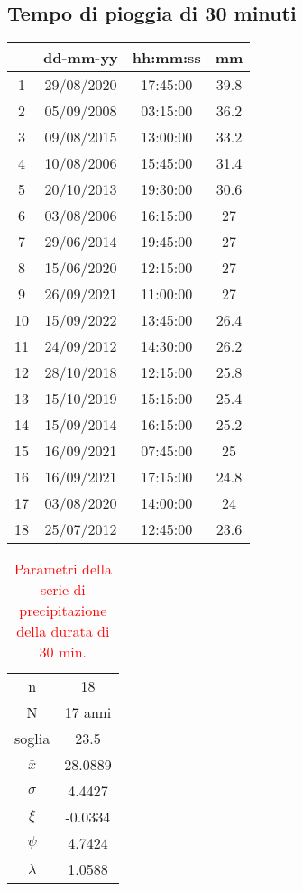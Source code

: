 \subsection{Tempo di pioggia di 30 minuti}
\begin{table}[H] \centering
    \begin{tabular}{cccc}
        \toprule
       & dd-mm-yy   & hh:mm:ss & mm \\
       \midrule
    1  & 29/08/2020 & 17:45:00 & 39.8 \\
    2  & 05/09/2008 & 03:15:00 & 36.2 \\
    3  & 09/08/2015 & 13:00:00 & 33.2 \\
    4  & 10/08/2006 & 15:45:00 & 31.4 \\
    5  & 20/10/2013 & 19:30:00 & 30.6 \\
    6  & 03/08/2006 & 16:15:00 & 27   \\
    7  & 29/06/2014 & 19:45:00 & 27   \\
    8  & 15/06/2020 & 12:15:00 & 27   \\
    9  & 26/09/2021 & 11:00:00 & 27   \\
    10 & 15/09/2022 & 13:45:00 & 26.4 \\
    11 & 24/09/2012 & 14:30:00 & 26.2 \\
    12 & 28/10/2018 & 12:15:00 & 25.8 \\
    13 & 15/10/2019 & 15:15:00 & 25.4 \\
    14 & 15/09/2014 & 16:15:00 & 25.2 \\
    15 & 16/09/2021 & 07:45:00 & 25   \\
    16 & 16/09/2021 & 17:15:00 & 24.8 \\
    17 & 03/08/2020 & 14:00:00 & 24   \\
    18 & 25/07/2012 & 12:45:00 & 23.6 \\
    \bottomrule
    \end{tabular}
    \end{table}

    \begin{table}[H] \centering
        \caption{\textcolor{red}{Parametri della serie di precipitazione della durata di 30 min.}}
        \begin{tabular}{cc}
            \toprule
        n        &     18    \\
        N        & 17 anni \\
        soglia   &    23.5     \\
        $\bar{x}$ &  28.0889      \\
        $\sigma$ &    4.4427     \\
        $\xi$      &  -0.0334     \\
        $\psi$      &  4.7424   \\
        $\lambda$   &  1.0588  \\
    \bottomrule    
    \end{tabular}
        \end{table}

